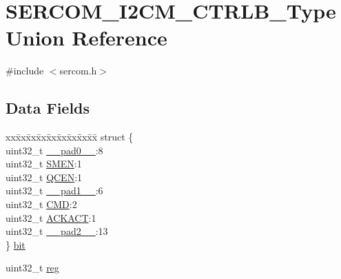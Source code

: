 \hypertarget{union_s_e_r_c_o_m___i2_c_m___c_t_r_l_b___type}{}\section{S\+E\+R\+C\+O\+M\+\_\+\+I2\+C\+M\+\_\+\+C\+T\+R\+L\+B\+\_\+\+Type Union Reference}
\label{union_s_e_r_c_o_m___i2_c_m___c_t_r_l_b___type}


{\ttfamily \#include $<$sercom.\+h$>$}

\subsection*{Data Fields}
\begin{DoxyCompactItemize}
\item 
\begin{tabbing}
xx\=xx\=xx\=xx\=xx\=xx\=xx\=xx\=xx\=\kill
struct \{\\
\>uint32\_t \mbox{\hyperlink{union_s_e_r_c_o_m___i2_c_m___c_t_r_l_b___type_a3e57c2ef1c3ffb36722f000cc1156824}{\_\_pad0\_\_}}:8\\
\>uint32\_t \mbox{\hyperlink{union_s_e_r_c_o_m___i2_c_m___c_t_r_l_b___type_a31bff5f79c11bb1b5fe501ccb4738f12}{SMEN}}:1\\
\>uint32\_t \mbox{\hyperlink{union_s_e_r_c_o_m___i2_c_m___c_t_r_l_b___type_a98785001edf3e2fe272ae8d7f6f09c76}{QCEN}}:1\\
\>uint32\_t \mbox{\hyperlink{union_s_e_r_c_o_m___i2_c_m___c_t_r_l_b___type_a6712ba6dd1d5b43d2d56ff8ac4e275a7}{\_\_pad1\_\_}}:6\\
\>uint32\_t \mbox{\hyperlink{union_s_e_r_c_o_m___i2_c_m___c_t_r_l_b___type_a6114f503a02e060bd76b962d5c0e35c3}{CMD}}:2\\
\>uint32\_t \mbox{\hyperlink{union_s_e_r_c_o_m___i2_c_m___c_t_r_l_b___type_aaed952b6044ad29bbba8a21ed0955ac9}{ACKACT}}:1\\
\>uint32\_t \mbox{\hyperlink{union_s_e_r_c_o_m___i2_c_m___c_t_r_l_b___type_a9ce12a63de64ef64ae2d59d128251cae}{\_\_pad2\_\_}}:13\\
\} \mbox{\hyperlink{union_s_e_r_c_o_m___i2_c_m___c_t_r_l_b___type_ac75452d979a7fb285d046d6660f9d9c6}{bit}}\\

\end{tabbing}\item 
uint32\+\_\+t \mbox{\hyperlink{union_s_e_r_c_o_m___i2_c_m___c_t_r_l_b___type_a6b91636401516a477989a336376d7b40}{reg}}
\end{DoxyCompactItemize}


